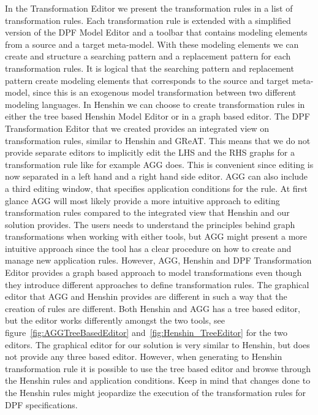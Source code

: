 In the Transformation Editor we present the transformation rules in a list of
transformation rules. Each transformation rule is extended with a simplified
version of the DPF Model Editor and a toolbar that contains modeling elements
from a source and a target meta-model. With these modeling elements we can
create and structure a searching pattern and a replacement pattern for each
transformation rules. It is logical that the searching pattern and replacement
pattern create modeling elements that corresponds to the source and target
meta-model, since this is an exogenous model transformation between two
different modeling languages. In Henshin we can choose to create transformation
rules in either the tree based Henshin Model Editor or in a graph based editor.
The DPF Transformation Editor that we created provides an integrated view on
transformation rules, similar to Henshin and GReAT\cite{GReAT}. This means that
we do not provide separate editors to implicitly edit the LHS and the RHS
graphs for a transformation rule like for example AGG does. This is convenient
since editing is now separated in a left hand and a right hand side editor. AGG
can also include a third editing window, that specifies application conditions
for the rule. At first glance AGG will most likely provide a more intuitive
approach to editing transformation rules compared to the integrated view that
Henshin and our solution provides. The users needs to understand the principles
behind graph transformations when working with either tools, but AGG might
present a more intuitive approach since the tool has a clear procedure on how
to create and manage new application rules. However, AGG, Henshin and DPF
Transformation Editor provides a graph based approach to model transformations
even though they introduce different approaches to define transformation rules.
The graphical editor that AGG and Henshin provides are different in such a way
that the creation of rules are different. Both Henshin and AGG has a tree based
editor, but the editor works differently amongst the two tools, see
figure~\ref{fig:AGGTreeBasedEditor} and~\ref{fig:Henshin_TreeEditor} for the
two editors. The graphical editor for our solution is very similar to Henshin,
but does not provide any three based editor. However, when generating to
Henshin transformation rule it is possible to use the tree based editor and
browse through the Henshin rules and application conditions. Keep in mind that
changes done to the Henshin rules might jeopardize the execution of the
transformation rules for DPF specifications.


